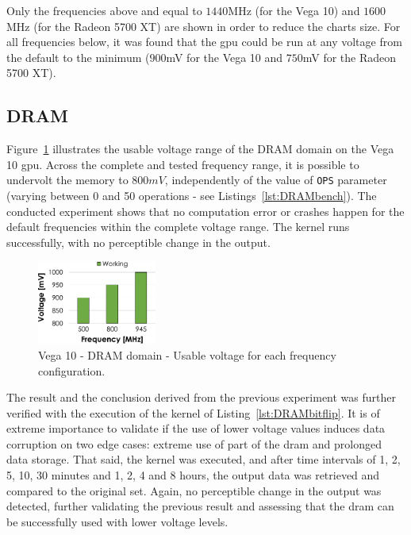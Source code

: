 Only the frequencies above and equal to $1440$MHz (for the Vega 10) and $1600$MHz (for the Radeon 5700 XT) are shown in order to reduce the charts size. For all frequencies below, it was found that the \acrshort{gpu} could be run at any voltage from the default to the minimum ($900$mV for the Vega 10 and $750$mV for the Radeon 5700 XT).

\subsection{DRAM}

Figure~\ref{fig:DRAM_guardband} illustrates the usable voltage range of the DRAM domain on the Vega 10 \acrshort{gpu}. Across the complete and tested frequency range, it is possible to undervolt the memory to $800mV$, independently of the value of \texttt{OPS} parameter (varying between 0 and 50 operations - see Listings~\ref{lst:DRAMbench}).
The conducted experiment shows that no computation error or crashes happen for the default frequencies within the complete voltage range. The kernel runs successfully, with no perceptible change in the output.


\begin{figure}[htb]
  \centering
  \includegraphics[width=0.35\textwidth]{Figures/GPU_characterization/DRAM_Guardband.pdf}
  \caption{Vega 10 - DRAM domain - Usable voltage for each frequency configuration.}
  \label{fig:DRAM_guardband}
\end{figure}

The result and the conclusion derived from the previous experiment was further verified with the execution of the kernel of Listing~\ref{lst:DRAMbitflip}. It is of extreme importance to validate if the use of lower voltage values induces data corruption on two edge cases: extreme use of part of the \acrshort{dram} and prolonged data storage. That said, the kernel was executed, and after time intervals of 1, 2, 5, 10, 30 minutes and 1, 2, 4 and 8 hours, the output data was retrieved and compared to the original set. Again, no perceptible change in the output was detected, further validating the previous result and assessing that the \acrshort{dram} can be successfully used with lower voltage levels. 

